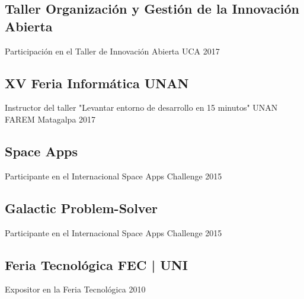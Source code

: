 \begin{minipage}[t]{0.33\textwidth}
\subsection{Taller Organización y Gestión de la Innovación Abierta}
Participación en el Taller de Innovación Abierta UCA 2017
\sectionspace %

\subsection{XV Feria Informática UNAN}
Instructor del taller "Levantar entorno de desarrollo en 15 minutos" UNAN FAREM Matagalpa 2017
\sectionspace %

\subsection{Space Apps}
Participante en el Internacional Space Apps Challenge 2015
\sectionspace %

\subsection{Galactic Problem-Solver}
Participante en el Internacional Space Apps Challenge 2015
\sectionspace %

\subsection{Feria Tecnológica FEC | UNI}
Expositor en la Feria Tecnológica 2010
\sectionspace

\end{minipage} %
\hfill
%
%
